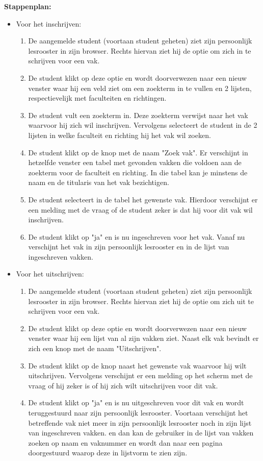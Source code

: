 \textbf{Stappenplan:}
\begin{itemize}
\item Voor het inschrijven:
	\begin{enumerate}
	\item De aangemelde student (voortaan student geheten) ziet zijn persoonlijk lesrooster in zijn browser. Rechts hiervan ziet hij de optie om zich in te schrijven voor een vak.
	\item De student klikt op deze optie en wordt doorverwezen naar een nieuw venster waar hij een veld ziet om een zoekterm in te vullen en 2 lijsten, respectievelijk met faculteiten en richtingen.
	\item De student vult een zoekterm in. Deze zoekterm verwijst naar het vak waarvoor hij zich wil inschrijven. Vervolgens selecteert de student in de 2 lijsten in welke faculteit en richting hij het vak wil zoeken.
	\item De student klikt op de knop met de naam "Zoek vak". Er verschijnt in hetzelfde venster een tabel met gevonden vakken die voldoen aan de zoekterm voor de faculteit en richting. In die tabel kan je minstens de naam en de titularis van het vak bezichtigen.
	\item De student selecteert in de tabel het gewenste vak. Hierdoor verschijnt er een melding met de vraag of de student zeker is dat hij voor dit vak wil inschrijven.
	\item De student klikt op "ja" en is nu ingeschreven voor het vak. Vanaf nu verschijnt het vak in zijn persoonlijk lesrooster en in de lijst van ingeschreven vakken.
	\end{enumerate}
	
\item Voor het uitschrijven:
	\begin{enumerate}
	\item De aangemelde student (voortaan student geheten) ziet zijn persoonlijk lesrooster in zijn browser. Rechts hiervan ziet hij de optie om zich uit te schrijven voor een vak.
	\item De student klikt op deze optie en wordt doorverwezen naar een nieuw venster waar hij een lijst van al zijn vakken ziet. Naast elk vak bevindt er zich een knop met de naam "Uitschrijven".
	\item De student klikt op de knop naast het gewenste vak waarvoor hij wilt uitschrijven. Vervolgens verschijnt er een melding op het scherm met de vraag of hij zeker is of hij zich wilt uitschrijven voor dit vak.
	\item De student klikt op "ja" en is nu uitgeschreven voor dit vak en wordt teruggestuurd naar zijn persoonlijk lesrooster. Voortaan verschijnt het betreffende vak niet meer in zijn persoonlijk lesrooster noch in zijn lijst van ingeschreven vakken. en dan kan de gebruiker in de lijst van vakken zoeken op naam en vaknummer en wordt dan naar een pagina doorgestuurd waarop deze in lijstvorm te zien zijn.
	\end{enumerate}
\end{itemize}

